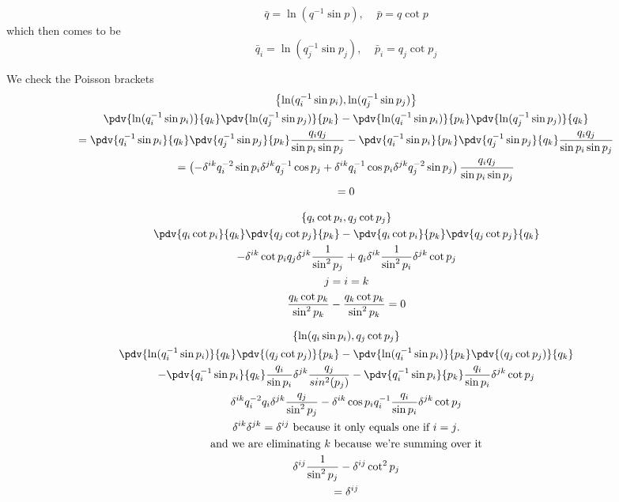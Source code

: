 \documentclass[]{scrartcl}
\begin{document}
\subsection{}

\begin{equation}
	\bar q = \ln(q^{-1}\sin p),\;\;\;\; \bar p = q\cot p
\end{equation}
which then comes to be 
\begin{equation}
	\bar q_i = \ln(q_j^{-1}\sin p_j),\;\;\;\; \bar p_i = q_j\cot p_j
\end{equation}

We check the Poisson brackets
\begin{gather}
	\left\{\ln(q_i^{-1}\sin p_i), \ln(q_j^{-1}\sin p_j)\right\}\\
	\pdv{\ln(q_i^{-1}\sin p_i)}{q_k}\pdv{\ln(q_j^{-1}\sin p_j)}{p_k} - \pdv{\ln(q_i^{-1}\sin p_i)}{p_k}\pdv{\ln(q_j^{-1}\sin p_j)}{q_k}\\
= \pdv{q_i^{-1}\sin p_i}{q_k}\pdv{q_j^{-1}\sin p_j}{p_k}\frac{q_iq_j}{\sin p_i \sin p_j} - \pdv{q_i^{-1}\sin p_i}{p_k}\pdv{q_j^{-1}\sin p_j}{q_k}\frac{q_iq_j}{\sin p_i \sin p_j}\\
= \left(-\delta^{ik}q_i^{-2}\sin p_i \delta^{jk}q_j^{-1}\cos p_j + \delta^{ik}q_i^{-1}\cos p_i \delta^{jk}q_j^{-2}\sin p_j\right)\frac{q_iq_j}{\sin p_i \sin p_j}\\
= 0
\end{gather}

\begin{gather}
	\left\{q_i \cot p_i, q_j \cot p_j\right\}\\
\pdv{q_i\cot p_i}{q_k}\pdv{q_j \cot p_j}{p_k} - \pdv{q_i \cot p_i}{p_k}\pdv{q_j \cot p_j}{q_k}\\
-\delta^{ik}\cot p_i q_j \delta^{jk}\frac{1}{\sin^2 p_j} + q_i \delta^{ik}\frac{1}{\sin^2 p_i}\delta^{jk}\cot p_j\\
j = i = k\nonumber\\
\frac{q_k \cot p_k}{\sin^2 p_k} - \frac{q_k \cot p_k}{\sin^2 p_k} = 0
\end{gather}

\begin{gather}
	\left\{\ln(q_i \sin p_i), q_j\cot p_j\right\}\\
	\pdv{\ln(q_i^{-1}\sin p_i)}{q_k}\pdv{(q_j\cot p_j)}{p_k} - \pdv{\ln(q_i^{-1}\sin p_i)}{p_k}\pdv{(q_j\cot p_j)}{q_k}\\
-\pdv{q_i^{-1}\sin p_i}{q_k}\frac{q_i}{\sin p_i}\delta^{jk}\frac{q_j}{sin^2(p_j)} - \pdv{q_i^{-1}\sin p_i}{p_k}\frac{q_i}{\sin p_i}\delta^{jk}\cot p_j\\
\delta^{ik}q_i^{-2}q_i\delta^{jk}\frac{q_j}{\sin^2p_j} - \delta^{ik}\cos p_i q_i^{-1} \frac{q_i}{\sin p_i}\delta^{jk}\cot p_j\\
\text{$\delta^{ik}\delta^{jk} = \delta^{ij}$ because it only equals one if $i = j$.}\nonumber\\
\text{and we are eliminating $k$ because we're summing over it}\nonumber\\
\delta^{ij} \frac{1}{\sin^2 p_j} - \delta^{ij}\cot^2 p_j\\
= \delta^{ij}
\end{gather}
\end{document}
